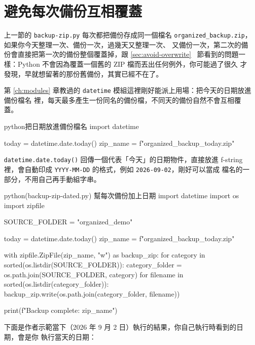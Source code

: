 \section{避免每次備份互相覆蓋}
\label{sec:backup-timestamp}

上一節的 \texttt{backup-zip.py} 每次都把備份存成同一個檔名
\texttt{organized\_backup.zip}，如果你今天整理一次、備份一次，過幾天又整理一次、
又備份一次，第二次的備份會直接把第一次的備份整個覆蓋掉，跟 \ref{sec:avoid-overwrite}~
節看到的問題一樣：Python 不會因為覆蓋一個舊的 ZIP 檔而丟出任何例外，你可能過了很久
才發現，早就想留著的那份舊備份，其實已經不在了。

第 \ref{ch:modules} 章教過的 \texttt{datetime} 模組這裡剛好能派上用場：把今天的日期放進備份檔名
裡，每天最多產生一份同名的備份檔，不同天的備份自然不會互相覆蓋。

\begin{code}{python}{把日期放進備份檔名}
import datetime

today = datetime.date.today()
zip_name = f"organized_backup_{today}.zip"
\end{code}

\texttt{datetime.date.today()} 回傳一個代表「今天」的日期物件，直接放進 f-string
裡，會自動印成 \texttt{YYYY-MM-DD} 的格式，例如 \texttt{2026-09-02}，剛好可以當成
檔名的一部分，不用自己再手動組字串。

\begin{example}{python}{(backup-zip-dated.py) 幫每次備份加上日期}
import datetime
import os
import zipfile

SOURCE_FOLDER = "organized_demo"

today = datetime.date.today()
zip_name = f"organized_backup_{today}.zip"

with zipfile.ZipFile(zip_name, "w") as backup_zip:
    for category in sorted(os.listdir(SOURCE_FOLDER)):
        category_folder = os.path.join(SOURCE_FOLDER, category)
        for filename in sorted(os.listdir(category_folder)):
            backup_zip.write(os.path.join(category_folder, filename))

print(f"Backup complete: {zip_name}")
\end{example}

下面是作者示範當下（2026 年 9 月 2 日）執行的結果，你自己執行時看到的日期，會是你
執行當天的日期：



